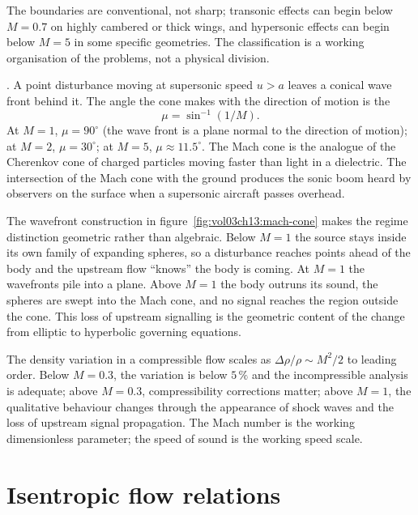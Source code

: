 The boundaries are conventional, not sharp; transonic effects can
begin below $M = 0.7$ on highly cambered or thick wings, and
hypersonic effects can begin below $M = 5$ in some specific
geometries. The classification is a working organisation of the
problems, not a physical division.

. A point disturbance moving at
supersonic speed $u > a$ leaves a conical wave front behind it.
The angle the cone makes with the direction of motion is the
\[
\mu = \sin^{-1}(1/M).
\]
At $M = 1$, $\mu = 90^{\circ}$ (the wave front is a plane normal
to the direction of motion); at $M = 2$, $\mu = 30^{\circ}$; at
$M = 5$, $\mu \approx 11.5^{\circ}$. The Mach cone is the analogue
of the Cherenkov cone of charged particles moving faster than light
in a dielectric. The intersection of the Mach cone with the
ground produces the sonic boom heard by observers on the surface
when a supersonic aircraft passes overhead.



The wavefront construction in figure~\ref{fig:vol03ch13:mach-cone}
makes the regime distinction geometric rather than algebraic. Below
$M = 1$ the source stays inside its own family of expanding spheres,
so a disturbance reaches points ahead of the body and the upstream
flow ``knows'' the body is coming. At $M = 1$ the wavefronts pile into
a plane. Above $M = 1$ the body outruns its sound, the spheres are
swept into the Mach cone, and no signal reaches the region outside
the cone. This loss of upstream signalling is the geometric content of
the change from elliptic to hyperbolic governing equations.

\begin{principle}
The density variation in a compressible flow scales as
$\Delta\rho/\rho \sim M^2/2$ to leading order. Below $M = 0.3$,
the variation is below $5\,\%$ and the incompressible analysis is
adequate; above $M = 0.3$, compressibility corrections matter;
above $M = 1$, the qualitative behaviour changes through the
appearance of shock waves and the loss of upstream signal
propagation. The Mach number is the working dimensionless
parameter; the speed of sound is the working speed scale.
\end{principle}

\section{Isentropic flow relations}


